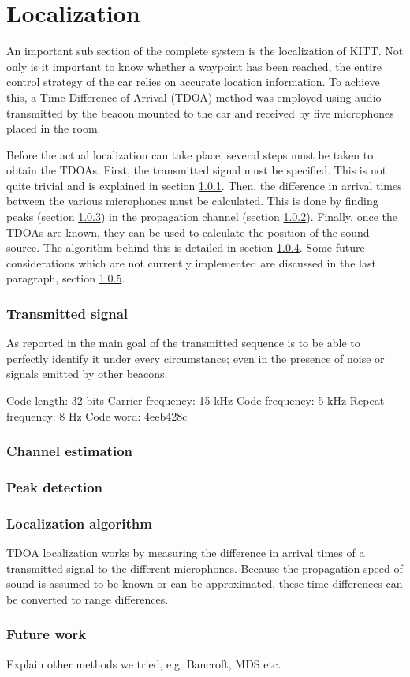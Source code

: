 \documentclass[11pt,titlepage]{report}
\begin{document}
\chapter{Localization}
An important sub section of the complete system is the localization of KITT. Not only is it important to know whether a waypoint has been reached, the entire control strategy of the car relies on accurate location information. To achieve this, a Time-Difference of Arrival (TDOA) method was employed using audio transmitted by the beacon mounted to the car and received by five microphones placed in the room.

Before the actual localization can take place, several steps must be taken to obtain the TDOAs. First, the transmitted signal must be specified. This is not quite trivial and is explained in section \ref{sec:loc_transmit}. Then, the difference in arrival times between the various microphones must be calculated. This is done by finding peaks (section \ref{sec:loc_peak}) in the propagation channel (section \ref{sec:loc_est_h}). Finally, once the TDOAs are known, they can be used to calculate the position of the sound source. The algorithm behind this is detailed in section \ref{sec:loc_alg}. Some future considerations which are not currently implemented are discussed in the last paragraph, section \ref{sec:loc_future}.

\subsection{Transmitted signal}
\label{sec:loc_transmit}
As reported in \citep{epo4-del7} the main goal of the transmitted sequence is to be able to perfectly identify it under every circumstance; even in the presence of noise or signals emitted by other beacons. 

Code length: 32 bits
Carrier frequency: 15 kHz
Code frequency: 5 kHz
Repeat frequency: 8 Hz
Code word: 4eeb428c

\subsection{Channel estimation}
\label{sec:loc_est_h}

\subsection{Peak detection}
\label{sec:loc_peak}

\subsection{Localization algorithm}
\label{sec:loc_alg}
TDOA localization works by measuring the difference in arrival times of a transmitted signal to the different microphones. Because the propagation speed of sound is assumed to be known or can be approximated, these time differences can be converted to range differences. 

\subsection{Future work}
\label{sec:loc_future}
Explain other methods we tried, e.g. Bancroft, MDS etc.
\end{document}
